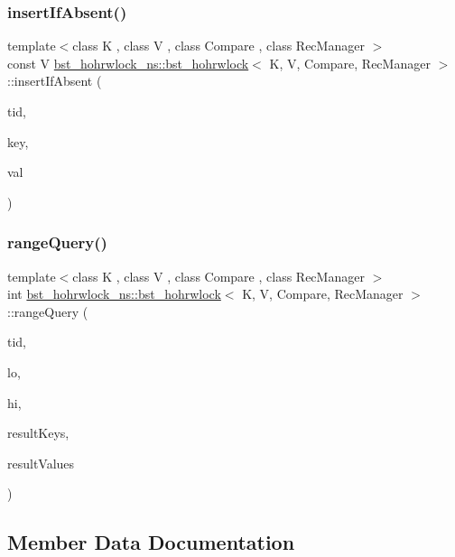 \subsubsection{\texorpdfstring{insert\+If\+Absent()}{insertIfAbsent()}}
{\footnotesize\ttfamily template$<$class K , class V , class Compare , class Rec\+Manager $>$ \\
const V \hyperlink{classbst__hohrwlock__ns_1_1bst__hohrwlock}{bst\+\_\+hohrwlock\+\_\+ns\+::bst\+\_\+hohrwlock}$<$ K, V, Compare, Rec\+Manager $>$\+::insert\+If\+Absent (\begin{DoxyParamCaption}\item[{const int}]{tid,  }\item[{const K \&}]{key,  }\item[{const V \&}]{val }\end{DoxyParamCaption})\hspace{0.3cm}{\ttfamily [inline]}}

\mbox{\label{classbst__hohrwlock__ns_1_1bst__hohrwlock_a741882cdc7b3a31ad95132c194d89631}} 
\subsubsection{\texorpdfstring{range\+Query()}{rangeQuery()}}
{\footnotesize\ttfamily template$<$class K , class V , class Compare , class Rec\+Manager $>$ \\
int \hyperlink{classbst__hohrwlock__ns_1_1bst__hohrwlock}{bst\+\_\+hohrwlock\+\_\+ns\+::bst\+\_\+hohrwlock}$<$ K, V, Compare, Rec\+Manager $>$\+::range\+Query (\begin{DoxyParamCaption}\item[{const int}]{tid,  }\item[{const K \&}]{lo,  }\item[{const K \&}]{hi,  }\item[{K $\ast$const}]{result\+Keys,  }\item[{V $\ast$const}]{result\+Values }\end{DoxyParamCaption})\hspace{0.3cm}{\ttfamily [inline]}}



\subsection{Member Data Documentation}
\mbox{\label{classbst__hohrwlock__ns_1_1bst__hohrwlock_af518cc20774b8b40621b298ad7a095e4}} 
